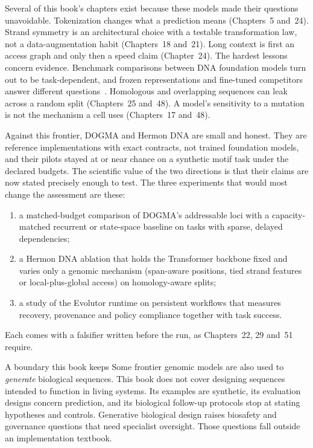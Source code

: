 Several of this book's chapters exist because these models made their questions
unavoidable. Tokenization changes what a prediction means (Chapters~5 and~24). Strand
symmetry is an architectural choice with a testable transformation law, not a
data-augmentation habit (Chapters~18 and~21). Long context is first an access graph
and only then a speed claim (Chapter~24). The hardest lessons concern evidence.
Benchmark comparisons between DNA foundation models turn out to be task-dependent, and
frozen representations and fine-tuned competitors answer different
questions~\cite{evod48:benchmark}. Homologous and overlapping sequences can leak across
a random split (Chapters~25 and~48). A model's sensitivity to a mutation is not the
mechanism a cell uses (Chapters~17 and~48).

Against this frontier, DOGMA and Hermon DNA are small and honest. They are reference
implementations with exact contracts, not trained foundation models, and their pilots
stayed at or near chance on a synthetic motif task under the declared budgets. The scientific
value of the two directions is that their claims are now stated precisely enough to
test. The three experiments that would most change the assessment are these:
\begin{enumerate}
\setlength{\itemsep}{1pt}
\item a matched-budget comparison of DOGMA's addressable loci with a capacity-matched
recurrent or state-space baseline on tasks with sparse, delayed dependencies;
\item a Hermon DNA ablation that holds the Transformer backbone fixed and varies only a
genomic mechanism (span-aware positions, tied strand features or local-plus-global
access) on homology-aware splits;
\item a study of the Evolutor runtime on persistent workflows that measures recovery,
provenance and policy compliance together with task success.
\end{enumerate}
Each comes with a falsifier written before the run, as Chapters~22, 29 and~51 require.

\begin{EvolutorNote}{A boundary this book keeps}
Some frontier genomic models are also used to \emph{generate} biological sequences. This
book does not cover designing sequences intended to function in living systems.
Its examples are synthetic, its evaluation designs concern prediction, and its
biological follow-up protocols stop at stating hypotheses and controls. Generative
biological design raises biosafety and governance questions that need specialist
oversight. Those questions fall outside an implementation textbook.
\end{EvolutorNote}

